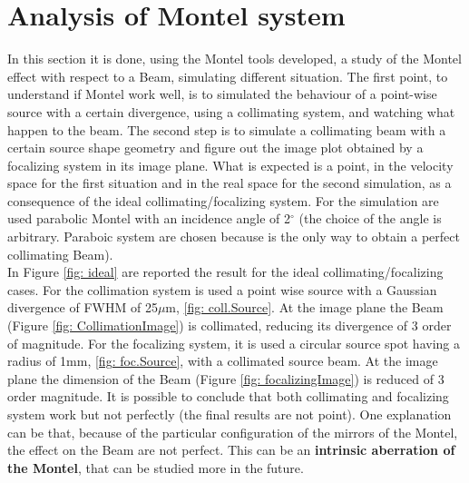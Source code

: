 \section{Analysis of Montel system}
In this section it is done, using the Montel tools developed, a study of the Montel effect with respect to a Beam, simulating different situation. The first point, to understand if  Montel work well, is to simulated the behaviour of a point-wise source with a certain divergence, using a collimating system, and watching what happen to the beam. The  second step is to simulate a collimating beam with a certain source shape geometry and figure out the image plot obtained by a focalizing system in its image plane. What is expected is a point, in the velocity space for the first situation and in the real space for the second simulation, as a consequence of the ideal collimating/focalizing system. For the simulation are used parabolic Montel with an incidence angle of 2$^{\circ} $ (the choice of the angle is arbitrary. Paraboic system are chosen because is the only way to obtain a perfect collimating Beam).
\\
In Figure \ref{fig: ideal} are reported the result for the ideal collimating/focalizing cases.
For the collimation system is used a point wise source with a Gaussian divergence of FWHM of 25$\mu $m, \ref{fig: coll.Source}. At the image plane the Beam (Figure \ref{fig: CollimationImage}) is collimated, reducing its divergence of 3 order of magnitude. For the focalizing system, it is used a circular source spot having a radius of 1mm, \ref{fig: foc.Source}, with a collimated source beam. At the image plane the dimension of the Beam (Figure \ref{fig: focalizingImage}) is reduced of 3 order magnitude. It is possible to conclude that both collimating and focalizing system work but not perfectly (the final results are not point). One explanation can be that, because of the particular configuration of the mirrors of the Montel, the effect on the Beam are not perfect. This can be an \textbf{intrinsic aberration of the Montel}, that can be studied more in the future.
\\
